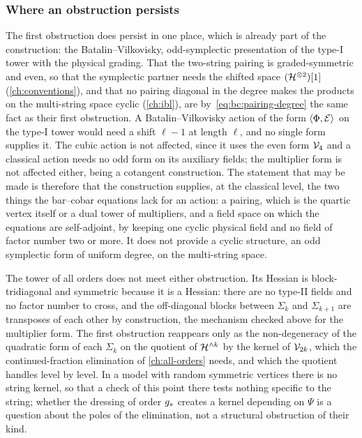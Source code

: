 \subsubsection{Where an obstruction persists}

The first obstruction does persist in one place, which is already part of the construction: the Batalin--Vilkovisky, odd-symplectic presentation of the type-I tower with the physical grading.
That the two-string pairing is graded-symmetric and even, so that the symplectic partner needs the shifted space $(\mathcal{H}^{\otimes 2})[1]$ (\cref{ch:conventions}), and that no pairing diagonal in the degree makes the products on the multi-string space cyclic (\cref{ch:ibl}), are by~\eqref{eq:bc:pairing-degree} the same fact as their first obstruction.
A Batalin--Vilkovisky action of the form $\braket{\Phi, \mathcal E}_{}$ on the type-I tower would need a shift $\ell - 1$ at length $\ell$, and no single form supplies it.
The cubic action is not affected, since it uses the even form $\mathcal{V}_{4}$ and a classical action needs no odd form on its auxiliary fields; the multiplier form is not affected either, being a cotangent construction.
The statement that may be made is therefore that the construction supplies, at the classical level, the two things the bar--cobar equations lack for an action: a pairing, which is the quartic vertex itself or a dual tower of multipliers, and a field space on which the equations are self-adjoint, by keeping one cyclic physical field and no field of factor number two or more.
It does not provide a cyclic structure, an odd symplectic form of uniform degree, on the multi-string space.

The tower of all orders does not meet either obstruction.
Its Hessian is block-tridiagonal and symmetric because it is a Hessian: there are no type-II fields and no factor number to cross, and the off-diagonal blocks between $\Sigma_k$ and $\Sigma_{k+1}$ are transposes of each other by construction, the mechanism checked above for the multiplier form.
The first obstruction reappears only as the non-degeneracy of the quadratic form of each $\Sigma_k$ on the quotient of $\mathcal{H}^{\wedge k}$ by the kernel of $\mathcal{V}_{2k}$, which the continued-fraction elimination of \cref{ch:all-orders} needs, and which the quotient handles level by level.
In a model with random symmetric vertices there is no string kernel, so that a check of this point there tests nothing specific to the string; whether the dressing of order $g_s$ creates a kernel depending on $\Psi$ is a question about the poles of the elimination, not a structural obstruction of their kind.


